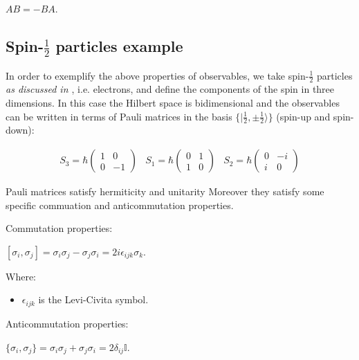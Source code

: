 \documentclass{Configuration_Files/PoliMi3i_thesis}
\begin{document}
\begin{center}
	$AB = - BA$. 
\end{center}


\subsection{Spin-$\frac{1}{2}$ particles example}

In order to exemplify the above properties of observables, we take spin-$\frac{1}{2}$ particles \textit{as discussed in \cite{Cor23}}, i.e. electrons, and define the components of the spin in three dimensions. In this case the Hilbert space is bidimensional and the observables can be written in terms of Pauli matrices in the basis $\{ | \frac{1}{2}, \pm \frac{1}{2} \rangle \}$ (spin-up and spin-down):


\[
\begin{array}{ccc}
	\text{$S_3$} = \hbar
	\begin{pmatrix}
		1 & 0 \\
		0 & -1
	\end{pmatrix} &
	\text{$S_1$} = \hbar
	\begin{pmatrix}
		0 & 1 \\
		1 & 0
	\end{pmatrix} &
	\text{$S_2$} = \hbar
	\begin{pmatrix}
		0 & -i \\
		i & 0
	\end{pmatrix}
\end{array}
\]

Pauli matrices satisfy hermiticity and unitarity Moreover they satisfy some specific commuation and anticommutation properties.

Commutation properties:

\begin{center}
	$[\sigma_i, \sigma_j] = \sigma_i \sigma_j - \sigma_j \sigma_i 
	= 2i\epsilon_{ijk} \sigma_k$.
\end{center}

Where:

\begin{itemize}
	\item \( \epsilon_{ijk} \) is the Levi-Civita symbol.
\end{itemize}

Anticommutation properties:

\begin{center}
	$\{\sigma_i, \sigma_j\} = \sigma_i \sigma_j + \sigma_j \sigma_i 
	= 2 \delta_{ij}\mathbb{I}$.
\end{center}
\end{document}
